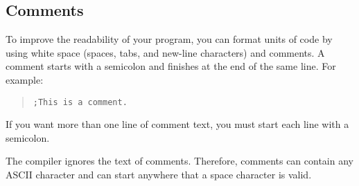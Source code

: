 \subsection{Comments}

To improve the readability of your program, you can format units of
code by using white space (spaces, tabs, and new-line characters) and
comments. A comment starts with a semicolon and finishes at the end of
the same line. For example:

\begin{quote}
\begin{verbatim}
;This is a comment.
\end{verbatim}
\end{quote}

If you want more than one line of comment text, you must start each
line with a semicolon.

The compiler ignores the text of comments.  Therefore, comments can
contain any ASCII character and can start anywhere that a space
character is valid.

